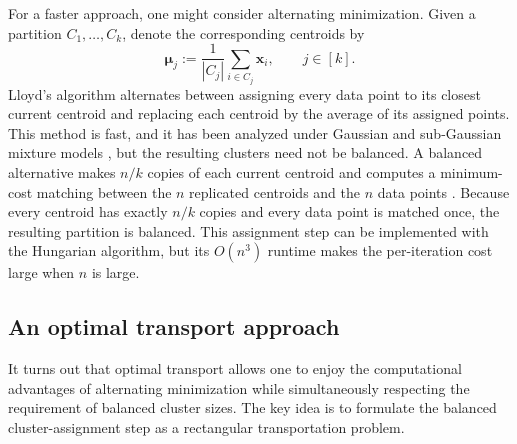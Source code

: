 \documentclass{article}
\theoremstyle{plain}
\theoremstyle{definition}
\newcommand{\1}{\mathbf{1}}
\newcommand{\bmu}{\bm{\mu}}
\begin{document}
For a faster approach, one might consider alternating minimization.
Given a partition $C_1,\ldots,C_k$, denote the corresponding centroids by
\[
\bmu_j:=\frac{1}{|C_j|}\sum_{i\in C_j}\bm{x}_i,
\qquad j\in[k].
\]
Lloyd's algorithm alternates between assigning every data point to its closest current centroid and replacing each centroid by the average of its assigned points.
This method is fast, and it has been analyzed under Gaussian and sub-Gaussian mixture models \cite{awasthi2018clustering,lu2016statistical}, but the resulting clusters need not be balanced.
A balanced alternative makes $n/k$ copies of each current centroid and computes a minimum-cost matching between the $n$ replicated centroids and the $n$ data points \cite{malinen2014balanced}.
Because every centroid has exactly $n/k$ copies and every data point is matched once, the resulting partition is balanced.
This assignment step can be implemented with the Hungarian algorithm, but its $O(n^3)$ runtime makes the per-iteration cost large when $n$ is large.

\subsection{An optimal transport approach}

It turns out that optimal transport allows one to enjoy the computational advantages of alternating minimization while simultaneously respecting the requirement of balanced cluster sizes.
The key idea is to formulate the balanced cluster-assignment step as a rectangular transportation problem.
\end{document}
